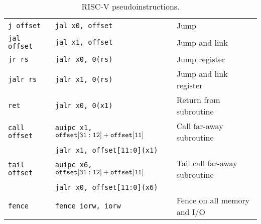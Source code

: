 \begin{table}[h]
\begin{small}
\begin{center}
\begin{tabular}{l l l}
\hline
{\tt j offset} & {\tt jal x0, offset} & Jump \\
{\tt jal offset} & {\tt jal x1, offset} & Jump and link \\
{\tt jr rs} & {\tt jalr x0, 0(rs)} & Jump register \\
{\tt jalr rs} & {\tt jalr x1, 0(rs)} & Jump and link register \\
{\tt ret} & {\tt jalr x0, 0(x1)} & Return from subroutine \\
\tt call offset & {\tt auipc x1, ${\tt offset[31:12]} + {\tt offset[11]}$} & Call far-away subroutine \\
                & {\tt jalr x1, offset[11:0](x1)}                          & \\
\tt tail offset & {\tt auipc x6, ${\tt offset[31:12]} + {\tt offset[11]}$} & Tail call far-away subroutine \\
                & {\tt jalr x0, offset[11:0](x6)}                          & \\
\hline
{\tt fence} & {\tt fence iorw, iorw} & Fence on all memory and I/O \\
\hline

\end{tabular}
\end{center}
\end{small}
\caption{RISC-V pseudoinstructions.}
\label{pseudos}
\end{table}

